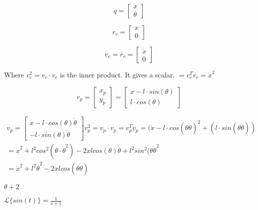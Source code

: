 \documentclass[a4paper]{article}
\begin{document}
 
\begin{equation}
q = \begin{bmatrix}
x \\
\theta 
\end{bmatrix}
\end{equation}

\begin{equation}
r_c = \begin{bmatrix}
x \\
0 
\end{bmatrix}
\end{equation}


\begin{equation}
v_c = \dot{r_c} = \begin{bmatrix}
\dot{x} \\
0
\end{bmatrix}
\end{equation}



Where $v_c^2 = v_c \cdot v_c$ is the inner product. It gives a scalar. 
$= v_c^T v_c = \dot{x}^2$


\[
r_p = \begin{bmatrix}
x_p  \\
y_p 
\end{bmatrix} = \begin{bmatrix}
x - l\cdot sin(\theta) \\
l\cdot cos(\theta)
\end{bmatrix}
\] 

\begin{equation}
\begin{split}
	v_p = \begin{bmatrix}
	\dot{x}-l\cdot cos(\theta) \dot{\theta} \\
	- l \cdot sin(\theta) \dot{\theta}
	\end{bmatrix} 
	v_p^2 = v_p\cdot v_p = v_p^T v_p = (\dot{x} - l\cdot cos(\theta\dot{\theta})^2 + (l\cdot sin(\theta \dot{\theta})) \\
	= \dot{x}^2 + l^2 cos^2(\theta \cdot \dot{\theta}^2) - 2 \dot{x} l cos(\theta) \dot{\theta} + l^2 sin^2(\theta \dot{\theta}^2 \\
	= \dot{x}^2 + l^2 \dot{\theta}^2 - 2\dot{x} l cos(\theta \dot{\theta})
\end{split}
\end{equation}



$ \theta + 2 $


$ \mathcal{L}\{sin(t)\} = \frac{1}{s + 1} $
\end{document}
